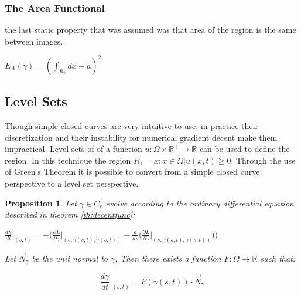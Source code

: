 \documentclass{article}
\newcommand{\R}{\mathds{R}}
\newtheorem{prop}{Proposition}
\begin{document}
			\subsubsection{The Area Functional}
				the last static property that was assumed was that area of the region is the same between images.
				\begin{center}
					$E_{A}(\gamma) = (\int_{R_\gamma}{dx} - a)^2$
				\end{center}

		\subsection{Level Sets}
			Though simple closed curves are  very intuitive to use, in practice their discretization and their instability for numerical gradient decent make them impractical. Level sets of of a function $u:\Omega\times\R^+\rightarrow\R$ can be used to define the region. In this technique the region $R_1 = {x: x\in\Omega|u(x,t)\geq0}$. Through the use of Green's Theorem it is possible to convert from a simple closed curve perspective to a level set perspective.

			\begin{prop}\label{pr:curvtofn}
				Let $\gamma\in C_e$ evolve according to the ordinary differential equation described in theorem \ref{th:decentfunc}:
				\begin{center}
					$\frac{d\gamma}{dt}\biggr\rvert_{(s,t)} = - \Bigg(\frac{\partial L}{\partial \gamma}\biggr\rvert_{(s,\gamma(s,t),\dot\gamma(s,t))} - \frac{d}{ds}\bigg(\frac{\partial L}{\partial \dot\gamma}\biggr\rvert_{(s,\gamma(s,t),\dot\gamma(s,t))}\bigg)\Bigg)$
				\end{center}
				Let $\vec N_\gamma$ be the unit normal to $\gamma$, Then there exists a function $F : \Omega \rightarrow \R$ such that:

				\begin{equation}\label{eq:greenscurv}
					\frac{d\gamma}{dt}\biggr\rvert_{(s,t)} = F(\gamma(s,t))\cdot \vec N_\gamma
				\end{equation}

			\end{prop}
\end{document}
